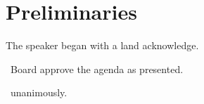\section*{Preliminaries}

\begin{information}

    The speaker began with a land acknowledge. 

\end{information}

\begin{motion}
    \birt\ Board approve the agenda as presented.
    \movers{\seneca}{\nickta}

    \carries\ unanimously.
\end{motion}

